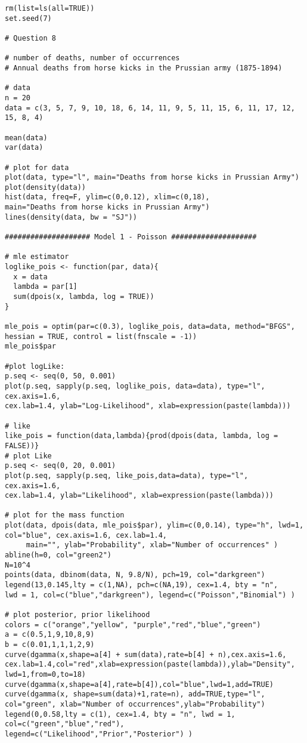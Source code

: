 \documentclass[a4paper, 11pt]{article}
\begin{document}
\begin{verbatim}
rm(list=ls(all=TRUE))
set.seed(7)

# Question 8

# number of deaths, number of occurrences 
# Annual deaths from horse kicks in the Prussian army (1875-1894)

# data
n = 20
data = c(3, 5, 7, 9, 10, 18, 6, 14, 11, 9, 5, 11, 15, 6, 11, 17, 12, 15, 8, 4)

mean(data)
var(data)

# plot for data
plot(data, type="l", main="Deaths from horse kicks in Prussian Army")
plot(density(data))
hist(data, freq=F, ylim=c(0,0.12), xlim=c(0,18),
main="Deaths from horse kicks in Prussian Army")
lines(density(data, bw = "SJ"))

#################### Model 1 - Poisson ####################

# mle estimator
loglike_pois <- function(par, data){
  x = data
  lambda = par[1]
  sum(dpois(x, lambda, log = TRUE))
}

mle_pois = optim(par=c(0.3), loglike_pois, data=data, method="BFGS", 
hessian = TRUE, control = list(fnscale = -1))
mle_pois$par

#plot logLike:
p.seq <- seq(0, 50, 0.001)
plot(p.seq, sapply(p.seq, loglike_pois, data=data), type="l", cex.axis=1.6,
cex.lab=1.4, ylab="Log-Likelihood", xlab=expression(paste(lambda)))

# like
like_pois = function(data,lambda){prod(dpois(data, lambda, log = FALSE))}
# plot Like
p.seq <- seq(0, 20, 0.001)
plot(p.seq, sapply(p.seq, like_pois,data=data), type="l", cex.axis=1.6,
cex.lab=1.4, ylab="Likelihood", xlab=expression(paste(lambda)))

# plot for the mass function
plot(data, dpois(data, mle_pois$par), ylim=c(0,0.14), type="h", lwd=1, 
col="blue", cex.axis=1.6, cex.lab=1.4,
     main="", ylab="Probability", xlab="Number of occurrences" )
abline(h=0, col="green2")
N=10^4
points(data, dbinom(data, N, 9.8/N), pch=19, col="darkgreen")
legend(13,0.145,lty = c(1,NA), pch=c(NA,19), cex=1.4, bty = "n", 
lwd = 1, col=c("blue","darkgreen"), legend=c("Poisson","Binomial") )

# plot posterior, prior likelihood
colors = c("orange","yellow", "purple","red","blue","green")
a = c(0.5,1,9,10,8,9)
b = c(0.01,1,1,1,2,9)
curve(dgamma(x,shape=a[4] + sum(data),rate=b[4] + n),cex.axis=1.6,
cex.lab=1.4,col="red",xlab=expression(paste(lambda)),ylab="Density",
lwd=1,from=0,to=18)
curve(dgamma(x,shape=a[4],rate=b[4]),col="blue",lwd=1,add=TRUE)
curve(dgamma(x, shape=sum(data)+1,rate=n), add=TRUE,type="l", 
col="green", xlab="Number of occurrences",ylab="Probability")
legend(0,0.58,lty = c(1), cex=1.4, bty = "n", lwd = 1, 
col=c("green","blue","red"), legend=c("Likelihood","Prior","Posterior") )


\end{verbatim}
\end{document}

